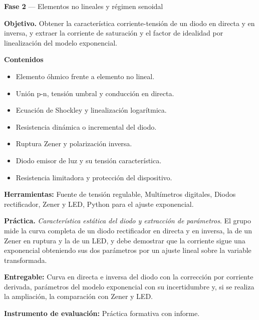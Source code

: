 \documentclass[11pt,a4paper]{article}
\begin{document}
\begin{tcolorbox}[cajaContenido,title={Semana 5 --- Elementos no lineales y el diodo semiconductor}]
\textbf{Fase 2} --- Elementos no lineales y régimen senoidal

\textbf{Objetivo.} Obtener la característica corriente-tensión de un diodo en directa y en inversa, y extraer la corriente de saturación y el factor de idealidad por linealización del modelo exponencial.

\textbf{Contenidos}

\begin{itemize}[leftmargin=1.4em,itemsep=2pt,topsep=3pt]
  \item Elemento óhmico frente a elemento no lineal.
  \item Unión p-n, tensión umbral y conducción en directa.
  \item Ecuación de Shockley y linealización logarítmica.
  \item Resistencia dinámica o incremental del diodo.
  \item Ruptura Zener y polarización inversa.
  \item Diodo emisor de luz y su tensión característica.
  \item Resistencia limitadora y protección del dispositivo.
\end{itemize}

\textbf{Herramientas:} Fuente de tensión regulable, Multímetros digitales, Diodos rectificador, Zener y LED, Python para el ajuste exponencial.

\textbf{Práctica.} \emph{Característica estática del diodo y extracción de parámetros}. El grupo mide la curva completa de un diodo rectificador en directa y en inversa, la de un Zener en ruptura y la de un LED, y debe demostrar que la corriente sigue una exponencial obteniendo sus dos parámetros por un ajuste lineal sobre la variable transformada.

\textbf{Entregable:} Curva en directa e inversa del diodo con la corrección por corriente derivada, parámetros del modelo exponencial con su incertidumbre y, si se realiza la ampliación, la comparación con Zener y LED.

\textbf{Instrumento de evaluación:} Práctica formativa con informe.
\end{tcolorbox}
\end{document}
